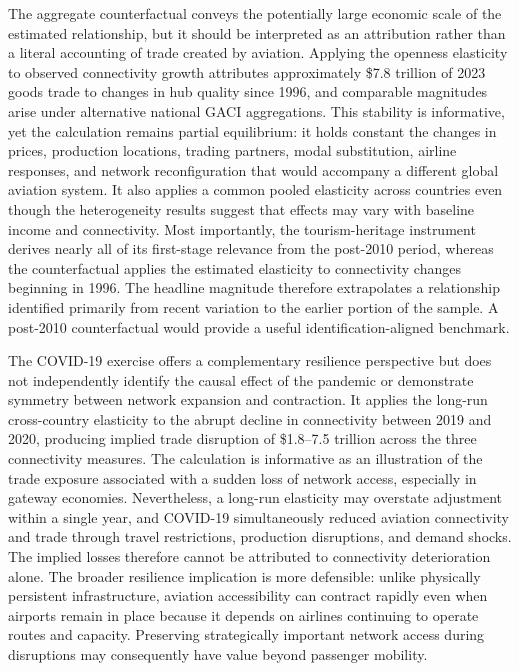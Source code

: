 The aggregate counterfactual conveys the potentially large economic scale of
the estimated relationship, but it should be interpreted as an attribution
rather than a literal accounting of trade created by aviation. Applying the
openness elasticity to observed connectivity growth attributes approximately
\$7.8 trillion of 2023 goods trade to changes in hub quality since 1996, and
comparable magnitudes arise under alternative national GACI aggregations.
This stability is informative, yet the calculation remains partial
equilibrium: it holds constant the changes in prices, production locations,
trading partners, modal substitution, airline responses, and network
reconfiguration that would accompany a different global aviation system. It
also applies a common pooled elasticity across countries even though the
heterogeneity results suggest that effects may vary with baseline income and
connectivity. Most importantly, the tourism-heritage instrument derives
nearly all of its first-stage relevance from the post-2010 period, whereas
the counterfactual applies the estimated elasticity to connectivity changes
beginning in 1996. The headline magnitude therefore extrapolates a
relationship identified primarily from recent variation to the earlier
portion of the sample. A post-2010 counterfactual would provide a useful
identification-aligned benchmark.

The COVID-19 exercise offers a complementary resilience perspective but does
not independently identify the causal effect of the pandemic or demonstrate
symmetry between network expansion and contraction. It applies the long-run
cross-country elasticity to the abrupt decline in connectivity between 2019
and 2020, producing implied trade disruption of \$1.8--7.5 trillion across
the three connectivity measures. The calculation is informative as an illustration of
the trade exposure associated with a sudden loss of network access,
especially in gateway economies. Nevertheless, a long-run elasticity may
overstate adjustment within a single year, and COVID-19 simultaneously
reduced aviation connectivity and trade through travel restrictions,
production disruptions, and demand shocks. The implied losses therefore
cannot be attributed to connectivity deterioration alone. The broader
resilience implication is more defensible: unlike physically persistent
infrastructure, aviation accessibility can contract rapidly even when
airports remain in place because it depends on airlines continuing to operate
routes and capacity. Preserving strategically important network access during
disruptions may consequently have value beyond passenger mobility.

